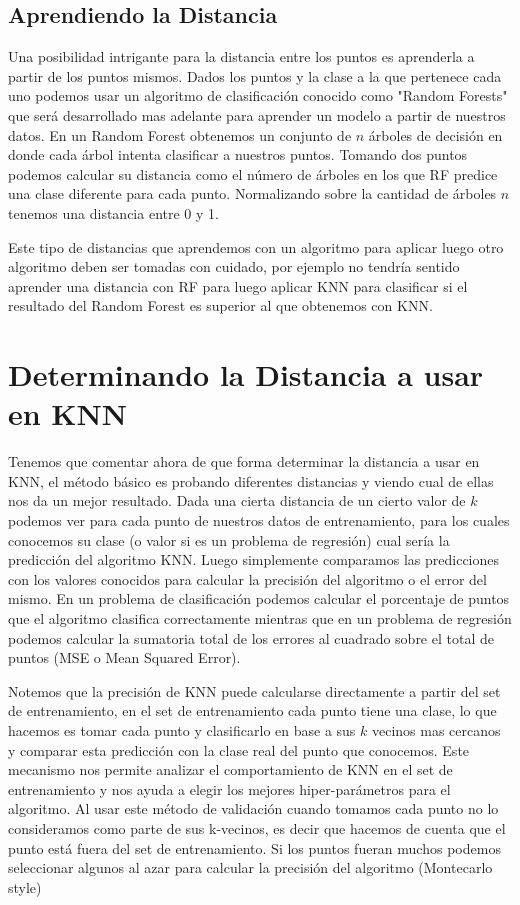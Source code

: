 \subsection{Aprendiendo la Distancia}

Una posibilidad intrigante para la distancia entre los puntos es aprenderla a partir de los puntos mismos. Dados los puntos y la clase a la que pertenece cada uno podemos usar un algoritmo de clasificación conocido como "Random Forests" que será desarrollado mas adelante para aprender un modelo a partir de nuestros datos. En un Random Forest obtenemos un conjunto de $n$ árboles de decisión en donde cada árbol intenta clasificar a nuestros puntos. Tomando dos puntos podemos calcular su distancia como el número de árboles en los que RF predice una clase diferente para cada punto. Normalizando sobre la cantidad de árboles $n$ tenemos una distancia entre 0 y 1. 

Este tipo de distancias que aprendemos con un algoritmo para aplicar luego otro algoritmo deben ser tomadas con cuidado, por ejemplo no tendría sentido aprender una distancia con RF para luego aplicar KNN para clasificar si el resultado del Random Forest es superior al que obtenemos con KNN. 

\section{Determinando la Distancia a usar en KNN}

Tenemos que comentar ahora de que forma determinar la distancia a usar en KNN, el método básico es probando diferentes distancias y viendo cual de ellas nos da un mejor resultado. Dada una cierta distancia de un cierto valor de $k$ podemos ver para cada punto de nuestros datos de entrenamiento, para los cuales conocemos su clase (o valor si es un problema de regresión) cual sería la predicción del algoritmo KNN. Luego simplemente comparamos las predicciones con los valores conocidos para calcular la precisión del algoritmo o el error del mismo. En un problema de clasificación podemos calcular el porcentaje de puntos que el algoritmo clasifica correctamente mientras que en un problema de regresión podemos calcular la sumatoria total de los errores al cuadrado sobre el total de puntos (MSE o Mean Squared Error).

Notemos que la precisión de KNN puede calcularse directamente a partir del set de entrenamiento, en el set de entrenamiento cada punto tiene una clase, lo que hacemos es tomar cada punto y clasificarlo en base a sus $k$ vecinos mas cercanos y comparar esta predicción con la clase real del punto que conocemos. Este mecanismo nos permite analizar el comportamiento de KNN en el set de entrenamiento y nos ayuda a elegir los mejores hiper-parámetros para el algoritmo. Al usar este método de validación cuando tomamos cada punto no lo consideramos como parte de sus k-vecinos, es decir que hacemos de cuenta que el punto está fuera del set de entrenamiento. Si los puntos fueran muchos podemos seleccionar algunos al azar para calcular la precisión del algoritmo (Montecarlo style)


